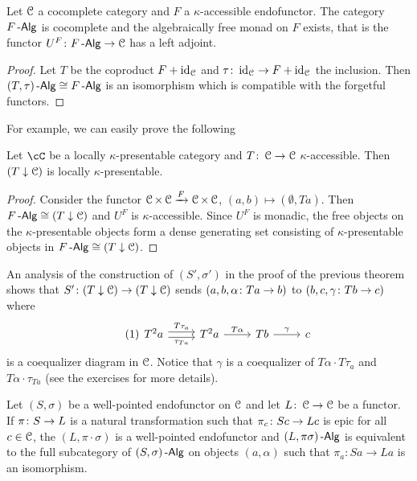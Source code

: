 \documentclass[a4paper,11pt,oneside,openany]{scrbook}
\begin{document}
\begin{thm}
	Let $ \operatorname{\mathcal{C}} $ a cocomplete category and $ F $ a $ \kappa $-accessible endofunctor.
	The category $ F\operatorname{-\mathsf{Alg}} $ is cocomplete and the algebraically free monad on $ F $ exists, that is the functor
	$ U^F \colon F\operatorname{-\mathsf{Alg}} \to \operatorname{\mathcal{C}} $ has a left adjoint.
\end{thm}
\begin{proof}
	Let $ T $ be the coproduct $ F + \operatorname{id}_{\operatorname{\mathcal{C}}} $ and $ \tau\colon \operatorname{id}_{\operatorname{\mathcal{C}}} \to F+\operatorname{id}_{\operatorname{\mathcal{C}}} $ the inclusion.
	Then $  (T,\tau)\operatorname{-\mathsf{Alg}} \cong F\operatorname{-\mathsf{Alg}} $ is an isomorphism which is compatible with the forgetful functors.
\end{proof}
For example, we can easily prove the following
\begin{prop}
	Let $ \cC $ be a locally $ \kappa $-presentable category and $ T \colon \operatorname{\mathcal{C}}
		\to \operatorname{\mathcal{C}} $ $ \kappa $-accessible. Then $ (T\downarrow\operatorname{\mathcal{C}}) $ is locally $ \kappa
	$-presentable.
\end{prop}
\begin{proof}
	Consider the functor $ \operatorname{\mathcal{C}} \times \operatorname{\mathcal{C}} \xrightarrow{F} \operatorname{\mathcal{C}} \times \operatorname{\mathcal{C}} $, $ (a,b)\mapsto (\emptyset, Ta) $.
	Then $ F\operatorname{-\mathsf{Alg}} \cong (T\downarrow\operatorname{\mathcal{C}}) $ and $ U^F $ is $ \kappa $-accessible.
	Since $ U^F  $ is monadic, the free objects on the $ \kappa $-presentable objects form a dense generating set consisting of $ \kappa $-presentable objects in $ F\operatorname{-\mathsf{Alg}} \cong (T\downarrow\operatorname{\mathcal{C}}) $.
\end{proof}
\begin{rmk}
	An analysis of the construction of $ (S',\sigma') $ in the proof of the previous theorem shows that $ S' \colon (T\downarrow\operatorname{\mathcal{C}}) \to (T\downarrow\operatorname{\mathcal{C}}) $ sends $ (a,b,\alpha \colon Ta \to b) $ to $ (b,c, \gamma \colon Tb \to c) $ where
	\begin{displaymath}\tag{1}\label{fork1}
		\begin{tikzcd}
			T^2 a \arrow[r,shift left, "T \tau_a"]\arrow[r,shift right, "\tau_{Ta}"']& T^2 a \arrow[r, "T\alpha" ] & Tb \arrow[r, "\gamma"]  & c
		\end{tikzcd}
	\end{displaymath}
	is a coequalizer diagram in $ \operatorname{\mathcal{C}} $.
	Notice that $ \gamma $ is a coequalizer of $ T\alpha \cdot T\tau_a $ and $
		T\alpha \cdot \tau_{Ta} $ (see the exercises for more details).
\end{rmk}
\begin{prop}
	Let $ (S,\sigma) $ be a well-pointed endofunctor on $ \operatorname{\mathcal{C}} $ and let $ L\colon \operatorname{\mathcal{C}} \to \operatorname{\mathcal{C}} $ be a functor.
	If $ \pi \colon S \to L $ is a natural transformation such that $ \pi_c \colon
		Sc \to Lc $ is epic for all $ c\in\operatorname{\mathcal{C}} $, the $ (L,\pi\cdot \sigma) $ is a well-pointed endofunctor and $ (L,\pi\sigma)\operatorname{-\mathsf{Alg}} $ is equivalent to the full subcategory of $ (S,\sigma)\operatorname{-\mathsf{Alg}} $ on objects $ (a,\alpha) $ such that $ \pi_a\colon Sa \to La $ is an isomorphism.
\end{prop}
\end{document}
